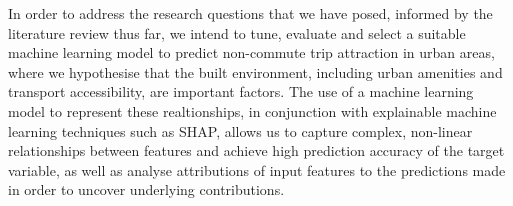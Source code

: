 In order to address the research questions that we have posed, informed by the literature review thus far, we intend to tune, evaluate and select a suitable machine learning model to predict non-commute trip attraction in urban areas, where we hypothesise that the built environment, including urban amenities and transport accessibility, are important factors. The use of a machine learning model to represent these realtionships, in conjunction with explainable machine learning techniques such as SHAP, allows us to capture complex, non-linear relationships between features and achieve high prediction accuracy of the target variable, as well as analyse attributions of input features to the predictions made in order to uncover underlying contributions.
